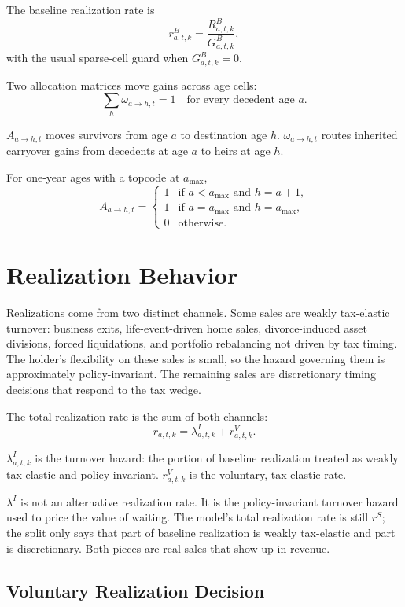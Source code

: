 \documentclass[11pt]{article}
\newcommand{\GB}{G^B}
\newcommand{\RB}{R^B}
\begin{document}
The baseline realization rate is
\[
r^B_{a,t,k} = \frac{\RB_{a,t,k}}{\GB_{a,t,k}},
\]
with the usual sparse-cell guard when $\GB_{a,t,k}=0$.

Two allocation matrices move gains across age cells:
\[
\sum_h \omega_{a \to h,t} = 1
\quad \text{for every decedent age } a.
\]

$A_{a \to h,t}$ moves survivors from age $a$ to destination age $h$.
$\omega_{a \to h,t}$ routes inherited carryover gains from decedents at age
$a$ to heirs at age $h$.

For one-year ages with a topcode at $a_{\max}$,
\[
A_{a \to h,t} =
\begin{cases}
1 & \text{if } a < a_{\max} \text{ and } h=a+1,\\
1 & \text{if } a = a_{\max} \text{ and } h=a_{\max},\\
0 & \text{otherwise.}
\end{cases}
\]

\section{Realization Behavior}

Realizations come from two distinct channels. Some sales are
weakly tax-elastic turnover: business exits, life-event-driven home sales,
divorce-induced asset divisions, forced liquidations, and portfolio
rebalancing not driven by tax timing. The holder's flexibility on these
sales is small, so the hazard governing them is approximately
policy-invariant. The remaining sales are discretionary timing decisions
that respond to the tax wedge.

The total realization rate is the sum of both channels:
\[
r_{a,t,k} = \lambda^I_{a,t,k} + r^V_{a,t,k}.
\]

$\lambda^I_{a,t,k}$ is the turnover hazard: the portion of baseline
realization treated as weakly tax-elastic and policy-invariant.
$r^V_{a,t,k}$ is the voluntary, tax-elastic rate.

$\lambda^I$ is not an alternative realization rate. It is the
policy-invariant turnover hazard used to price the value of waiting. The
model's total realization rate is still $r^S$; the split only says that
part of baseline realization is weakly tax-elastic and part is
discretionary. Both pieces are real sales that show up in revenue.

\subsection{Voluntary Realization Decision}
\end{document}
